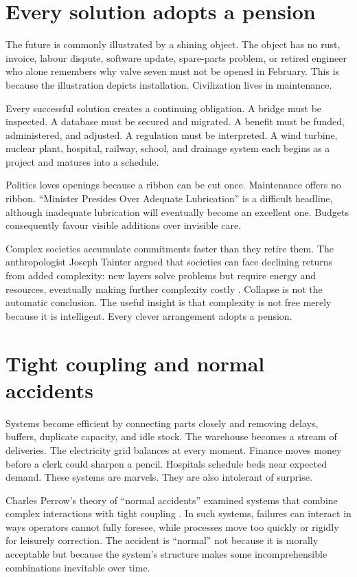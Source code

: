 \documentclass[12pt,a4paper]{book}
\begin{document}
\section{Every solution adopts a pension}

The future is commonly illustrated by a shining object.  The object has no
rust, invoice, labour dispute, software update, spare-parts problem, or retired
engineer who alone remembers why valve seven must not be opened in February.
This is because the illustration depicts installation.  Civilization lives in
maintenance.

Every successful solution creates a continuing obligation.  A bridge must be
inspected.  A database must be secured and migrated.  A benefit must be funded,
administered, and adjusted.  A regulation must be interpreted.  A wind turbine,
nuclear plant, hospital, railway, school, and drainage system each begins as a
project and matures into a schedule.

Politics loves openings because a ribbon can be cut once.  Maintenance offers
no ribbon.  ``Minister Presides Over Adequate Lubrication'' is a difficult
headline, although inadequate lubrication will eventually become an excellent
one.  Budgets consequently favour visible additions over invisible care.

Complex societies accumulate commitments faster than they retire them.  The
anthropologist Joseph Tainter argued that societies can face declining returns
from added complexity: new layers solve problems but require energy and
resources, eventually making further complexity costly
\cite{TainterCollapse1988}.  Collapse is not the automatic conclusion.  The
useful insight is that complexity is not free merely because it is intelligent.
Every clever arrangement adopts a pension.

\section{Tight coupling and normal accidents}

Systems become efficient by connecting parts closely and removing delays,
buffers, duplicate capacity, and idle stock.  The warehouse becomes a stream
of deliveries.  The electricity grid balances at every moment.  Finance moves
money before a clerk could sharpen a pencil.  Hospitals schedule beds near
expected demand.  These systems are marvels.  They are also intolerant of
surprise.

Charles Perrow's theory of ``normal accidents'' examined systems that combine
complex interactions with tight coupling \cite{PerrowNormalAccidents1984}.
In such systems, failures can interact in ways operators cannot fully foresee,
while processes move too quickly or rigidly for leisurely correction.  The
accident is ``normal'' not because it is morally acceptable but because the
system's structure makes some incomprehensible combinations inevitable over
time.
\end{document}
